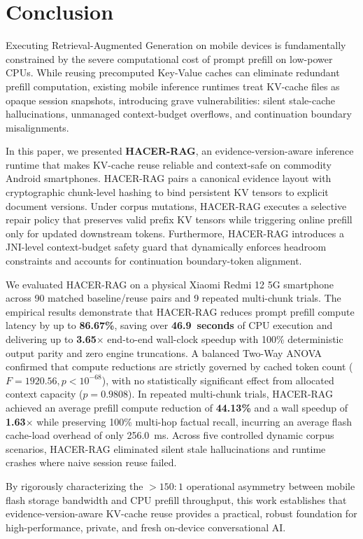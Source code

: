 \section{Conclusion}
\label{sec:conclusion}

Executing Retrieval-Augmented Generation on mobile devices is fundamentally constrained by the severe computational cost of prompt prefill on low-power CPUs. While reusing precomputed Key-Value caches can eliminate redundant prefill computation, existing mobile inference runtimes treat KV-cache files as opaque session snapshots, introducing grave vulnerabilities: silent stale-cache hallucinations, unmanaged context-budget overflows, and continuation boundary misalignments.

In this paper, we presented \textbf{HACER-RAG}, an evidence-version-aware inference runtime that makes KV-cache reuse reliable and context-safe on commodity Android smartphones. HACER-RAG pairs a canonical evidence layout with cryptographic chunk-level hashing to bind persistent KV tensors to explicit document versions. Under corpus mutations, HACER-RAG executes a selective repair policy that preserves valid prefix KV tensors while triggering online prefill only for updated downstream tokens. Furthermore, HACER-RAG introduces a JNI-level context-budget safety guard that dynamically enforces headroom constraints and accounts for continuation boundary-token alignment.

We evaluated HACER-RAG on a physical Xiaomi Redmi 12 5G smartphone across 90 matched baseline/reuse pairs and 9 repeated multi-chunk trials. The empirical results demonstrate that HACER-RAG reduces prompt prefill compute latency by up to \textbf{86.67\%}, saving over \textbf{46.9~seconds} of CPU execution and delivering up to \textbf{3.65$\times$} end-to-end wall-clock speedup with 100\% deterministic output parity and zero engine truncations. A balanced Two-Way ANOVA confirmed that compute reductions are strictly governed by cached token count ($F = 1920.56, p < 10^{-68}$), with no statistically significant effect from allocated context capacity ($p = 0.9808$). In repeated multi-chunk trials, HACER-RAG achieved an average prefill compute reduction of \textbf{44.13\%} and a wall speedup of \textbf{1.63$\times$} while preserving 100\% multi-hop factual recall, incurring an average flash cache-load overhead of only 256.0~ms. Across five controlled dynamic corpus scenarios, HACER-RAG eliminated silent stale hallucinations and runtime crashes where naive session reuse failed.

By rigorously characterizing the $>150:1$ operational asymmetry between mobile flash storage bandwidth and CPU prefill throughput, this work establishes that evidence-version-aware KV-cache reuse provides a practical, robust foundation for high-performance, private, and fresh on-device conversational AI.
